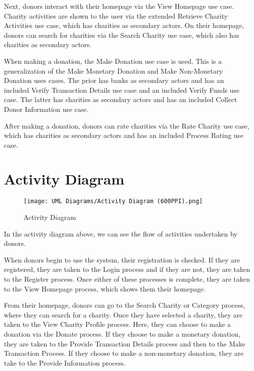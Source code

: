 \documentclass{scrreprt}
\begin{document}
    Next, donors interact with their homepage via the View Homepage use case. Charity activities are shown to the user via the extended Retrieve Charity Activities use case, which has charities as secondary actors. On their homepage, donors can search for charities via the Search Charity use case, which also has charities as secondary actors.\par
    
    When making a donation, the Make Donation use case is used. This is a generalization of the Make Monetary Donation and Make Non-Monetary Donation uses cases. The prior has banks as secondary actors and has an included Verify Transaction Details use case and an included Verify Funds use case. The latter has charities as secondary actors and has an included Collect Donor Information use case.\par
    
    After making a donation, donors can rate charities via the Rate Charity use case, which has charities as secondary actors and has an included Process Rating use case.
    
    \section{Activity Diagram}
        \begin{figure}[H]
            \centering
            \texttt{[image: UML Diagrams/Activity Diagram (600PPI).png]}
            {\caption*{Activity Diagram}}
        \end{figure}
        
    In the activity diagram above, we can see the flow of activities undertaken by donors.\par
    
    When donors begin to use the system, their registration is checked. If they are registered, they are taken to the Login process and if they are not, they are taken to the Register process. Once either of these processes is complete, they are taken to the View Homepage process, which shows them their homepage.\par
    
    From their homepage, donors can go to the Search Charity or Category process, where they can search for a charity. Once they have selected a charity, they are taken to the View Charity Profile process. Here, they can choose to make a donation via the Donate process. If they choose to make a monetary donation, they are taken to the Provide Transaction Details process and then to the Make Transaction Process. If they choose to make a non-monetary donation, they are take to the Provide Information process.\par
    
\end{document}
